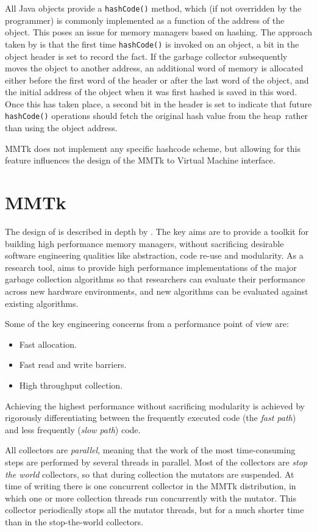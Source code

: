 All Java objects provide a \lstinline|hashCode()| method, which (if not overridden 
by the programmer) is commonly implemented as a function of the address of the 
object.  This poses an issue for memory managers based on hashing.  The approach 
taken by \jikes is that the first time \lstinline|hashCode()| is invoked on an object,
a bit in the object header is set to record the fact.  If the garbage collector
subsequently moves the object to another address, an additional word of memory is allocated
either before the first word of the header or after the last word of the object,
and the initial address of the object when it was first hashed is saved in this
word.  Once this has taken place, a second bit in the header is set to indicate that
future \lstinline|hashCode()| operations should fetch the original hash value from the heap\
rather than using the object address.

MMTk does not implement any specific hashcode scheme, but allowing for this feature
influences the design of the MMTk to Virtual Machine interface.

\section{MMTk}

The design of \mmtk is described in depth by \citet{BCM:04, BCM:04b}.
The key aims are to provide a toolkit for building high performance 
memory managers, without sacrificing desirable software engineering
qualities like abstraction, code re-use and modularity.  As a research tool, \mmtk aims
to provide high performance implementations of the major garbage collection algorithms
so that researchers can evaluate their performance across new hardware environments,
and new algorithms can be evaluated against existing algorithms.

Some of the key engineering concerns from a performance point of view are:
\begin{itemize}
  \item Fast allocation.  
  \item Fast read and write barriers.
  \item High throughput collection.
\end{itemize}
Achieving the highest performance without sacrificing modularity is achieved by rigorously
differentiating between the frequently executed code (the \emph{fast path}) and less frequently
(\emph{slow path}) code.

All \mmtk collectors are \emph{parallel}, meaning that the work of the most time-consuming 
steps are performed by several threads in parallel.  Most of the \mmtk collectors are 
\emph{stop the world} collectors, so that during collection the mutators are suspended.  At time
of writing there is one concurrent collector in the MMTk distribution, in which one or more
collection threads run concurrently with the mutator.  This collector periodically stops all the
mutator threads, but for a much shorter time than in the stop-the-world collectors.

